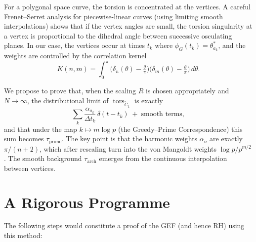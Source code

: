 \documentclass[12pt,a4paper]{article}
\newcommand{\tors}{\operatorname{tors}}
\begin{document}
For a polygonal space curve, the torsion is concentrated at the vertices.  A careful Frenet–Serret analysis for piecewise-linear curves (using limiting smooth interpolations) shows that if the vertex angles are small, the torsion singularity at a vertex is proportional to the dihedral angle between successive osculating planes.  In our case, the vertices occur at times \(t_k\) where \(\phi_G(t_k)=\theta_{a_k}^*\), and the weights are controlled by the correlation kernel
\[
K(n,m)=\int_0^\pi \bigl(\delta_n(\theta)-\tfrac{\theta}{\pi}\bigr)\bigl(\delta_m(\theta)-\tfrac{\theta}{\pi}\bigr)\,d\theta .
\]

We propose to prove that, when the scaling \(R\) is chosen appropriately and \(N\to\infty\), the distributional limit of \(\tors_{\widetilde{C}_1}\) is exactly
\[
\sum_{k} \frac{\alpha_{a_k}}{\Delta t_k}\,\delta(t-t_k) \;+\; \text{smooth terms},
\]
and that under the map \(k\mapsto m\log p\) (the Greedy–Prime Correspondence) this sum becomes \(\tau_{\mathrm{prime}}\).  The key point is that the harmonic weights \(\alpha_n\) are exactly \(\pi/(n+2)\), which after rescaling turn into the von Mangoldt weights \(\log p/p^{m/2}\).  The smooth background \(\tau_{\mathrm{arch}}\) emerges from the continuous interpolation between vertices.

\section{A Rigorous Programme}

The following steps would constitute a proof of the GEF (and hence RH) using this method:
\end{document}
